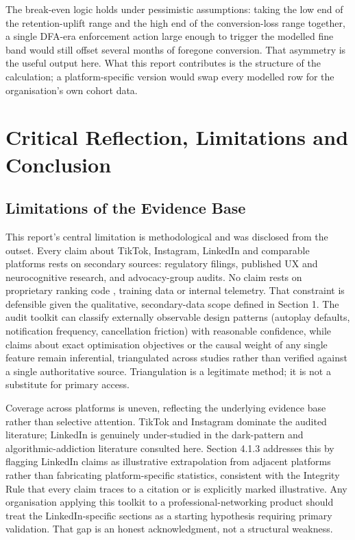 \documentclass[11pt]{article}
\begin{document}
The break-even logic holds under pessimistic assumptions: taking the low end of the retention-uplift range and the high end of the conversion-loss range together, a single DFA-era enforcement action large enough to trigger the modelled fine band would still offset several months of foregone conversion. That asymmetry is the useful output here. What this report contributes is the structure of the calculation; a platform-specific version would swap every modelled row for the organisation's own cohort data.

\section{Critical Reflection, Limitations and Conclusion}

\subsection{Limitations of the Evidence Base}
\label{sec:critical_reflection} This report's central limitation is methodological and was disclosed from the outset. Every claim about TikTok, Instagram, LinkedIn and comparable platforms rests on secondary sources: regulatory filings, published UX and neurocognitive research, and advocacy-group audits. No claim rests on proprietary ranking code \parencites[6]{6502223}[244]{2977039}, training data or internal telemetry. That constraint is defensible given the qualitative, secondary-data scope defined in Section 1. The audit toolkit can classify externally observable design patterns (autoplay defaults, notification frequency, cancellation friction) with reasonable confidence, while claims about exact optimisation objectives or the causal weight of any single feature remain inferential, triangulated across studies rather than verified against a single authoritative source. Triangulation is a legitimate method; it is not a substitute for primary access.

Coverage across platforms is uneven, reflecting the underlying evidence base rather than selective attention. TikTok and Instagram dominate the audited literature; LinkedIn is genuinely under-studied in the dark-pattern and algorithmic-addiction literature consulted here. Section 4.1.3 addresses this by flagging LinkedIn claims as illustrative extrapolation from adjacent platforms rather than fabricating platform-specific statistics, consistent with the Integrity Rule that every claim traces to a citation or is explicitly marked illustrative. Any organisation applying this toolkit to a professional-networking product should treat the LinkedIn-specific sections as a starting hypothesis requiring primary validation. That gap is an honest acknowledgment, not a structural weakness.
\end{document}
